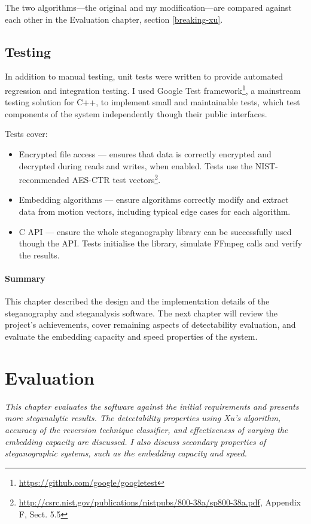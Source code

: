 \documentclass[12pt,british,twoside,notitlepage,usenames,dvipsnames,hypens,final]{report}
\numberwithin{equation}{section}
\numberwithin{figure}{section}
\begin{document}
The two algorithms---the original and my modification---are compared against each other in the Evaluation chapter, section \ref{breaking-xu}.

\section{Testing}

In addition to manual testing, unit tests were written to provide automated regression and integration testing. I used Google Test framework\footnote{\url{https://github.com/google/googletest}}, a mainstream testing solution for C++, to implement small and maintainable tests, which test components of the system independently though their public interfaces.

Tests cover:
\begin{itemize}
\item Encrypted file access --- ensures that data is correctly encrypted and decrypted during reads and writes, when enabled. Tests use the NIST-recommended AES-CTR test vectors\footnote{\url{http://csrc.nist.gov/publications/nistpubs/800-38a/sp800-38a.pdf}, Appendix F, Sect. 5.5}.
\item Embedding algorithms --- ensure algorithms correctly modify and extract data from motion vectors, including typical edge cases for each algorithm.
\item C API --- ensure the whole steganography library can be successfully used though the API. Tests initialise the library, simulate FFmpeg calls and verify the results.
\end{itemize}

\bigskip\bigskip
\subsubsection*{Summary}
This chapter described the design and the implementation details of the steganography and steganalysis software. The next chapter will review the project's achievements, cover remaining aspects of detectability evaluation, and evaluate the embedding capacity and speed properties of the system.

\cleardoublepage
\chapter{Evaluation}

\textit{This chapter evaluates the software against the initial requirements and presents more steganalytic results. The detectability properties using Xu's algorithm, accuracy of the reversion technique classifier, and effectiveness of varying the embedding capacity are discussed. I also discuss secondary properties of steganographic systems, such as the embedding capacity and speed.
}
\end{document}
